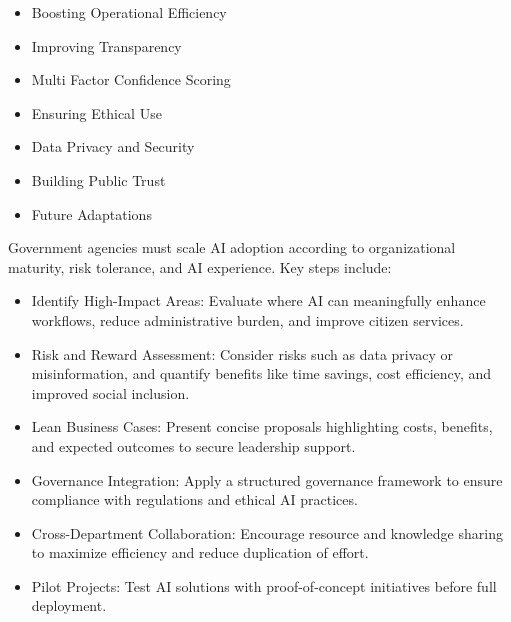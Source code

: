 \begin{itemize}

\item Boosting Operational Efficiency

\item Improving Transparency

\item Multi Factor Confidence Scoring

\item Ensuring Ethical Use

\item Data Privacy and Security

\item Building Public Trust

\item Future Adaptations

\end{itemize}


Government agencies must scale AI adoption according to organizational maturity, risk tolerance, and AI experience. Key steps include:

\begin{itemize}

\item Identify High-Impact Areas: Evaluate where AI can meaningfully enhance workflows, reduce administrative burden, and improve citizen services.

\item Risk and Reward Assessment: Consider risks such as data privacy or misinformation, and quantify benefits like time savings, cost efficiency, and improved social inclusion.

\item Lean Business Cases: Present concise proposals highlighting costs, benefits, and expected outcomes to secure leadership support.

\item Governance Integration: Apply a structured governance framework to ensure compliance with regulations and ethical AI practices.

\item Cross-Department Collaboration: Encourage resource and knowledge sharing to maximize efficiency and reduce duplication of effort.

\item Pilot Projects: Test AI solutions with proof-of-concept initiatives before full deployment.

\end{itemize}

